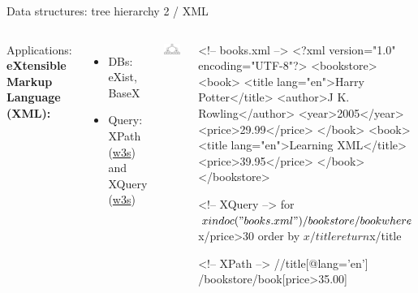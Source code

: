 \begin{frame}[fragile]{Data structures: tree hierarchy 2 / XML}
  \begin{columns}[T,onlytextwidth]
    Applications: \textbf{eXtensible Markup Language (XML):}
          \begin{itemize}\footnotesize
              \item DBs: eXist, BaseX 
              \item Query: 
              XPath (\href{https://www.w3schools.com/xml/xpath_intro.asp}{w3s}) and XQuery (\href{https://www.w3schools.com/xml/xquery_example.asp}{w3s})
          \end{itemize}
          \bigskip

      \begin{block}{}
        \includegraphics[width=0.95\textwidth]{img/baumstruktur.png}
      \end{block}

\begin{xmlcode}
<!-- books.xml -->
<?xml version="1.0" encoding="UTF-8"?>
<bookstore>
  <book>
    <title lang="en">Harry Potter</title>
    <author>J K. Rowling</author>
    <year>2005</year>
    <price>29.99</price>
  </book>
  <book>
    <title lang="en">Learning XML</title>
    <price>39.95</price>
  </book>
</bookstore>

<!-- XQuery -->
for $x in doc("books.xml")/bookstore/book
where $x/price>30
order by $x/title
return $x/title

<!-- XPath -->
//title[@lang='en']
/bookstore/book[price>35.00]
\end{xmlcode}

  \end{columns}
\end{frame}

